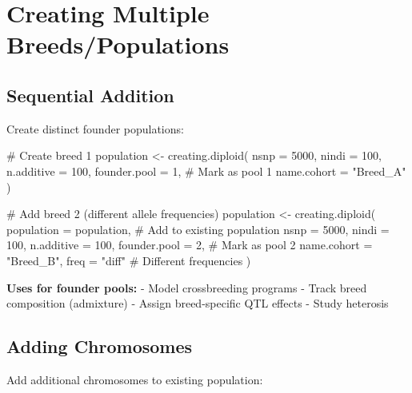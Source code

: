 \documentclass[
  letterpaper,
]{book}
\newenvironment{Shaded}{\begin{snugshade}}{\end{snugshade}}
\newcommand{\AttributeTok}[1]{\textcolor[rgb]{0.40,0.45,0.13}{#1}}
\newcommand{\CommentTok}[1]{\textcolor[rgb]{0.37,0.37,0.37}{#1}}
\newcommand{\DecValTok}[1]{\textcolor[rgb]{0.68,0.00,0.00}{#1}}
\newcommand{\FunctionTok}[1]{\textcolor[rgb]{0.28,0.35,0.67}{#1}}
\newcommand{\NormalTok}[1]{\textcolor[rgb]{0.00,0.23,0.31}{#1}}
\newcommand{\OtherTok}[1]{\textcolor[rgb]{0.00,0.23,0.31}{#1}}
\newcommand{\StringTok}[1]{\textcolor[rgb]{0.13,0.47,0.30}{#1}}
\begin{document}
\section{Creating Multiple
Breeds/Populations}\label{sec-multiple-breeds}

\subsection{Sequential Addition}\label{sequential-addition}

Create distinct founder populations:

\begin{Shaded}
\begin{Highlighting}[]
\CommentTok{\# Create breed 1}
\NormalTok{population }\OtherTok{\textless{}{-}} \FunctionTok{creating.diploid}\NormalTok{(}
  \AttributeTok{nsnp =} \DecValTok{5000}\NormalTok{,}
  \AttributeTok{nindi =} \DecValTok{100}\NormalTok{,}
  \AttributeTok{n.additive =} \DecValTok{100}\NormalTok{,}
  \AttributeTok{founder.pool =} \DecValTok{1}\NormalTok{,           }\CommentTok{\# Mark as pool 1}
  \AttributeTok{name.cohort =} \StringTok{"Breed\_A"}
\NormalTok{)}

\CommentTok{\# Add breed 2 (different allele frequencies)}
\NormalTok{population }\OtherTok{\textless{}{-}} \FunctionTok{creating.diploid}\NormalTok{(}
  \AttributeTok{population =}\NormalTok{ population,    }\CommentTok{\# Add to existing population}
  \AttributeTok{nsnp =} \DecValTok{5000}\NormalTok{,}
  \AttributeTok{nindi =} \DecValTok{100}\NormalTok{,}
  \AttributeTok{n.additive =} \DecValTok{100}\NormalTok{,}
  \AttributeTok{founder.pool =} \DecValTok{2}\NormalTok{,           }\CommentTok{\# Mark as pool 2}
  \AttributeTok{name.cohort =} \StringTok{"Breed\_B"}\NormalTok{,}
  \AttributeTok{freq =} \StringTok{"diff"}               \CommentTok{\# Different frequencies}
\NormalTok{)}
\end{Highlighting}
\end{Shaded}

\textbf{Uses for founder pools:} - Model crossbreeding programs - Track
breed composition (admixture) - Assign breed-specific QTL effects -
Study heterosis

\subsection{Adding Chromosomes}\label{adding-chromosomes}

Add additional chromosomes to existing population:
\end{document}
